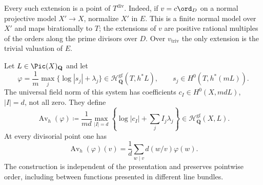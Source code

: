 \documentclass[11pt,a4paper]{article}
\newcommand{\divv}{\mathrm{div}}       %
\newcommand{\vtriv}{v_{\mathrm{triv}}} %
\newcommand{\Av}{\operatorname{Av}}
\begin{document}
Every such extension is a point of $T^{\divv}$.  Indeed, if $v=c\ord_D$ on a normal projective model $X'\to X$, normalize $X'$ in $E$.  This is a finite normal model over $X'$ and maps birationally to $T$; the extensions of $v$ are positive rational multiples of the orders along the prime divisors over $D$.  Over $\vtriv$ the only extension is the trivial valuation of $E$.

\begin{proposition}\label{prop:weighted-coefficient-norm}
Let $L\in\Pic(X)_{\mathbf Q}$ and let
\[
 \varphi=\frac1m\max_j\{\log|s_j|+\lambda_j\}
 \in\mathcal{H}^{\mathrm{gf}}_{\mathbf{Q}}(T,h^*L),\qquad
 s_j\in H^0(T,h^*(mL)).
\]
The universal field norm of this system has coefficients $c_I\in H^0(X,mdL)$, $|I|=d$, not all zero.  They define
\begin{equation}\label{eq:weighted-norm-definition}
 \Av_h(\varphi)\coloneqq\frac1{md}\max_{|I|=d}
 \left\{\log|c_I|+\sum_j I_j\lambda_j\right\}
 \in\mathcal{H}^{\mathrm{gf}}_{\mathbf{Q}}(X,L).
\end{equation}
At every divisorial point one has
\begin{equation}\label{eq:divisorial-field-average}
 \Av_h(\varphi)(v)
   =\frac1d\sum_{w\mid v}d(w/v)\varphi(w).
\end{equation}
The construction is independent of the presentation and preserves pointwise order, including between functions presented in different line bundles.
\end{proposition}
\end{document}
